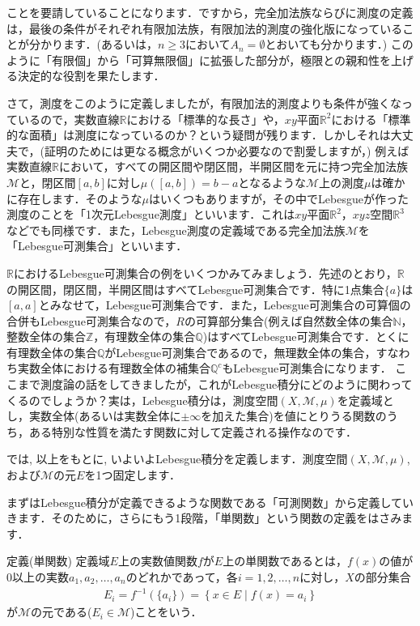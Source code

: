 ことを要請していることになります．ですから，完全加法族ならびに測度の定義は，最後の条件がそれぞれ有限加法族，有限加法的測度の強化版になっていることが分かります．(あるいは，$n\ge3$において$A_{n}=\emptyset$とおいても分かります．) このように「有限個」から「可算無限個」に拡張した部分が，極限との親和性を上げる決定的な役割を果たします．
\par さて，測度をこのように定義しましたが，有限加法的測度よりも条件が強くなっているので，実数直線$\mathbb{R}$における「標準的な長さ」や，$xy$平面$\mathbb{R}^2$における「標準的な面積」は測度になっているのか？という疑問が残ります．しかしそれは大丈夫で，(証明のためには更なる概念がいくつか必要なので割愛しますが，) 例えば実数直線$\mathbb{R}$において，すべての開区間や閉区間，半開区間を元に持つ完全加法族$\mathcal{M}$と，閉区間$[a,b]$に対し$\mu\left([a,b]\right)=b-a$となるような$\mathcal{M}$上の測度$\mu$は確かに存在します．そのような$\mu$はいくつもありますが，その中でLebesgueが作った測度のことを「1次元Lebesgue測度」といいます．これは$xy$平面$\mathbb{R}^2$，$xyz$空間$\mathbb{R}^3$などでも同様です．また，Lebesgue測度の定義域である完全加法族$\mathcal{M}$を「Lebesgue可測集合」といいます．
\par $\mathbb{R}$におけるLebesgue可測集合の例をいくつかみてみましょう．先述のとおり，$\mathbb{R}$の開区間，閉区間，半開区間はすべてLebesgue可測集合です．特に1点集合$\{a\}$は$[a,a]$とみなせて，Lebesgue可測集合です．また，Lebesgue可測集合の可算個の合併もLebesgue可測集合なので，$R$の可算部分集合(例えば自然数全体の集合$\mathbb{N}$，整数全体の集合$\mathbb{Z}$，有理数全体の集合$\mathbb{Q}$)はすべてLebesgue可測集合です．とくに有理数全体の集合$\mathbb{Q}$がLebesgue可測集合であるので，無理数全体の集合，すなわち実数全体における有理数全体の補集合$\mathbb{Q}^c$もLebesgue可測集合になります． 
ここまで測度論の話をしてきましたが，これがLebesgue積分にどのように関わってくるのでしょうか？実は，Lebesgue積分は，測度空間$(X,\mathcal{M},\mu)$を定義域とし，実数全体(あるいは実数全体に$\pm\infty$を加えた集合)を値にとりうる関数のうち，ある特別な性質を満たす関数に対して定義される操作なのです．
\par では, 以上をもとに, いよいよLebesgue積分を定義します．測度空間$(X,\mathcal{M},\mu)$, および$\mathcal{M}$の元$E$を1つ固定します．
\par まずはLebesgue積分が定義できるような関数である「可測関数」から定義していきます．そのために，さらにもう1段階，「単関数」という関数の定義をはさみます．
\begin{itembox}[l]{定義(単関数)}
定義域$E$上の実数値関数$f$が$E$上の単関数であるとは，$f(x)$の値が0以上の実数$a_1, a_2, \ldots, a_n$のどれかであって，各$i=1,2,\ldots,n$に対し，$X$の部分集合
\begin{eqnarray}
E_i=f^{-1}\left(\{ a_i\}\right)=\left\{x\in E\mid f(x)=a_i \right\} \nonumber
\end{eqnarray}
が$\mathcal{M}$の元である($E_i\in\mathcal{M}$)ことをいう．
\end{itembox}
